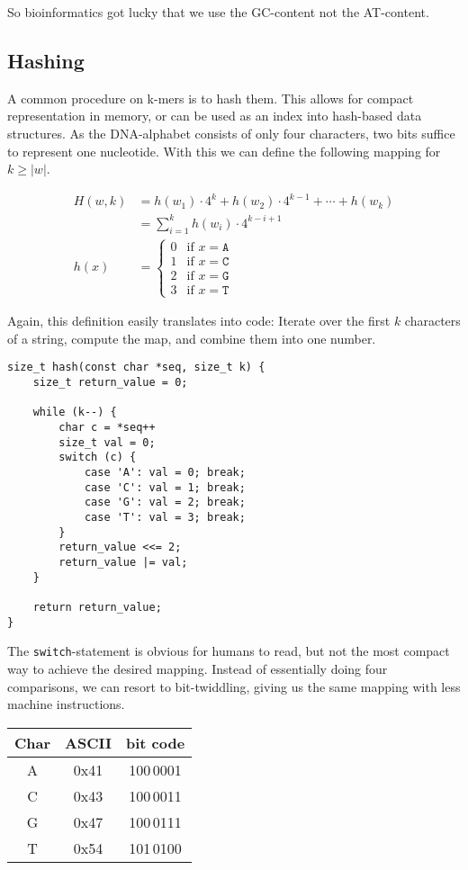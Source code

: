 \documentclass[10pt,letterpaper]{article}
\begin{document}
So bioinformatics got lucky that we use the GC-content not the AT-content.


\subsection*{Hashing}

A common procedure on k-mers is to hash them. This allows for compact representation in memory, or can be used as an index into hash-based data structures. As the DNA-alphabet consists of only four characters, two bits suffice to represent one nucleotide. With this we can define the following mapping for $k \ge |w|$.

\begin{align*}
	H(w, k) &= h(w_1) \cdot 4^{k} + h(w_2) \cdot 4^{k-1} + \cdots + h(w_k) \\
	&= \sum_{i=1}^k h(w_i)\cdot 4^{k-i+1} \\
	h(x) &=
		\begin{cases}
			0 & \text{if } x = \texttt{A} \\
			1 & \text{if } x = \texttt{C} \\
			2 & \text{if } x = \texttt{G} \\
			3 & \text{if } x = \texttt{T}
		\end{cases}
\end{align*}

Again, this definition easily translates into code: Iterate over the first $k$ characters of a string, compute the map, and combine them into one number.

\begin{lstlisting}
size_t hash(const char *seq, size_t k) {  
    size_t return_value = 0;

    while (k--) {
    	char c = *seq++
    	size_t val = 0;
    	switch (c) {
    		case 'A': val = 0; break;
    		case 'C': val = 1; break;
    		case 'G': val = 2; break;
    		case 'T': val = 3; break;
    	}
    	return_value <<= 2;
    	return_value |= val;
    }

    return return_value;
}
\end{lstlisting}

The \lstinline!switch!-statement is obvious for humans to read, but not the most compact way to achieve the desired mapping. Instead of essentially doing four comparisons, we can resort to bit-twiddling, giving us the same mapping with less machine instructions.

\begin{tabular}{ccc}
	\toprule
	Char & ASCII & bit code \\
	\hline
	A & 0x41 & 100\,0001 \\
	C & 0x43 & 100\,0011 \\
	G & 0x47 & 100\,0111 \\
	T & 0x54 & 101\,0100 \\
	\bottomrule
\end{tabular}
\end{document}
